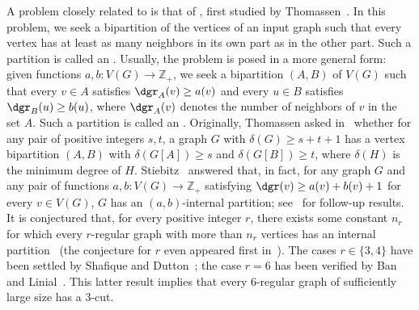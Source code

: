 A problem  closely related to  is that of , first studied by Thomassen~\cite{internal_partition_thomassen}.
In this problem, we seek a bipartition of the vertices of an input graph such that every vertex has at least as many neighbors in its
own part as in the other part. Such a partition is called an .
Usually, the problem is posed in a more general form: given functions $a,b: V(G) \rightarrow \mathbb{Z}_+$, we seek a bipartition $(A,B)$ of $V(G)$ such that every $v \in A$ satisfies $\dgr_A(v) \geq a(v)$ and every $u \in B$ satisfies $\dgr_B(u) \geq b(u)$, where $\dgr_A(v)$ denotes the number of neighbors of $v$ in the set $A$. Such a partition is called an .
Originally, Thomassen asked in~\cite{internal_partition_thomassen} whether for any pair of positive integers $s,t$, a graph $G$ with $\delta(G) \geq s + t + 1$ has a vertex bipartition $(A,B)$ with $\delta(G[A]) \geq s$ and $\delta(G[B]) \geq t$, where $\delta(H)$ is the minimum degree of $H$.
Stiebitz~\cite{internal_partition_stiebitz} answered that, in fact, for any graph $G$ and any pair of functions $a,b: V(G) \rightarrow \mathbb{Z}_+$ satisfying $\dgr(v) \geq a(v) + b(v) + 1$ for every $v \in V(G)$, $G$ has an $(a,b)$-internal partition; see~\cite{internal_partition_triangle_free,internal_partition_c4_free} for follow-up results.
It is conjectured that, for every positive integer $r$, there exists some constant $n_r$ for which every $r$-regular graph with more than $n_r$ vertices has an internal partition~\cite{DeVos09,internal_partition_regular6} (the conjecture for $r$ even appeared first in~\cite{internal_partition_regular3_4}).
The cases $r \in \{3,4\}$ have been settled by Shafique and Dutton~\cite{internal_partition_regular3_4}; the case $r=6$ has been verified by Ban and Linial~\cite{internal_partition_regular6}.
This latter result implies that every 6-regular graph of sufficiently large size has a 3-cut.

\medskip


